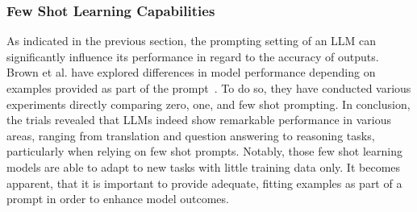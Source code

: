 \subsubsection{Few Shot Learning Capabilities}
\label{subsubsec:few-shot-learning-capabilities}
As indicated in the previous section, the prompting setting of an LLM can significantly influence its
performance in regard to the accuracy of outputs.
Brown et al\(.\) have explored differences
in model performance depending on examples provided as part of the prompt~\cite{brown_language_2020}.
To do so, they have conducted various experiments directly comparing zero, one, and few shot
prompting.
In conclusion, the trials revealed that LLMs indeed show remarkable performance in various areas,
ranging from translation and question answering to reasoning tasks, particularly when relying on
few shot prompts.
Notably, those few shot learning models are able to adapt to new tasks with little training data
only.
It becomes apparent, that it is important to provide adequate, fitting examples as part of a
prompt in order to enhance model outcomes.

